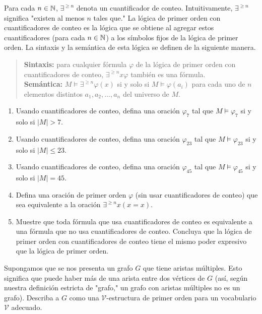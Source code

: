\documentclass[12pt,a4paper]{book}
\newcommand{\comillas}[1]{"#1"}
\newcommand{\VV}{\mathcal{V}}
\begin{document}
    \begin{ejercicio}
        Para cada $n\in\mathbb{N}$, $\exists^{\geq n}$ denota un cuantificador de conteo. Intuitivamente, $\exists^{\geq n}$
        significa \comillas{existen al menos $n$ tales que.} La lógica de primer orden con cuantificadores de conteo es
        la lógica que se obtiene al agregar estos cuantificadores (para cada $n\in\mathbb{N}$) a los símbolos fijos de la lógica
        de primer orden. La sintaxis y la semántica de esta lógica se definen de la siguiente manera.

        \begin{quote}
            \textbf{Sintaxis:} para cualquier fórmula $\varphi$ de la lógica de primer orden con cuantificadores de
            conteo, $\exists^{\geq n}x\varphi$ también es una fórmula.\\
            \textbf{Semántica:} $M\models\exists^{\geq n}\varphi(x)$ si y solo si $M\models\varphi(a_{i})$ para cada uno
            de $n$ elementos distintos $a_{1},a_{2},\dots,a_{n}$ del universo de $M$.
        \end{quote}

        \begin{enumerate}[label=(\alph*)]
            \item Usando cuantificadores de conteo, defina una oración $\varphi_{7}$ tal que $M\models\varphi_{7}$ si y
            solo si $|M|>7$.
            \item Usando cuantificadores de conteo, defina una oración $\varphi_{23}$ tal que $M\models\varphi_{23}$ si
            y solo si $|M|\leq 23$.
            \item Usando cuantificadores de conteo, defina una oración $\varphi_{45}$ tal que $M\models\varphi_{45}$ si
            y solo si $|M|=45$.
            \item Defina una oración de primer orden $\varphi$ (sin usar cuantificadores de conteo) que sea equivalente
            a la oración $\exists^{\geq n}x(x=x)$.
            \item Muestre que toda fórmula que usa cuantificadores de conteo es equivalente a una fórmula que no usa
            cuantificadores de conteo. Concluya que la lógica de primer orden con cuantificadores de conteo tiene el mismo
            poder expresivo que la lógica de primer orden.
        \end{enumerate}
    \end{ejercicio}

    \begin{ejercicio}
        Supongamos que se nos presenta un grafo $G$ que tiene aristas múltiples. Esto significa que puede haber más de
        una arista entre dos vértices de $G$ (así, según nuestra definición estricta de \comillas{grafo,} un grafo con
        aristas múltiples no es un grafo). Describa a $G$ como una $\VV$-estructura de primer orden para un vocabulario
        $\VV$ adecuado.
    \end{ejercicio}
\end{document}
